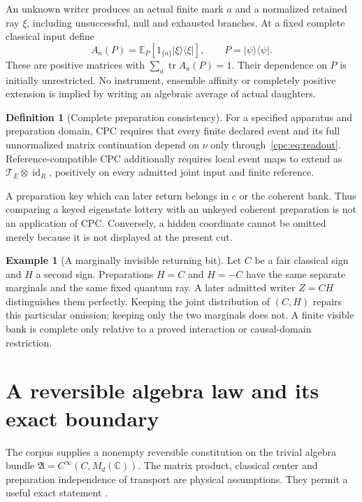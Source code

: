 \documentclass[11pt,oneside,openany]{book}
\theoremstyle{definition}
\newtheorem{definition}[theorem]{Definition}
\newtheorem{example}[theorem]{Example}
\theoremstyle{remark}\newtheorem{remark}[theorem]{Remark}
\begin{document}
An unknown writer produces an actual finite mark $a$ and a normalized retained ray $\xi$, including unsuccessful, null and exhausted branches. At a fixed complete classical input define
\begin{equation}
 A_a(P)=\mathbb E_P[1_{\{a\}}|\xi\rangle\langle\xi|],\qquad
 P=|\psi\rangle\langle\psi|.
 \label{cpc:eq:unknownwriter}
\end{equation}
These are positive matrices with $\sum_a\operatorname{tr}A_a(P)=1$. Their dependence on $P$ is initially unrestricted. No instrument, ensemble affinity or completely positive extension is implied by writing an algebraic average of actual daughters.

\begin{definition}[Complete preparation consistency]
\label{cpc:def:cpc}
For a specified apparatus and preparation domain, CPC requires that every finite declared event and its full unnormalized matrix continuation depend on $\nu$ only through~\eqref{cpc:eq:readout}. Reference-compatible CPC additionally requires local event maps to extend as $\mathcal T_E\otimes\operatorname{id}_R$, positively on every admitted joint input and finite reference.
\end{definition}

A preparation key which can later return belongs in $c$ or the coherent bank. Thus comparing a keyed eigenstate lottery with an unkeyed coherent preparation is not an application of CPC. Conversely, a hidden coordinate cannot be omitted merely because it is not displayed at the present cut.

\begin{example}[A marginally invisible returning bit]
Let $C$ be a fair classical sign and $H$ a second sign. Preparations $H=C$ and $H=-C$ have the same separate marginals and the same fixed quantum ray. A later admitted writer $Z=CH$ distinguishes them perfectly. Keeping the joint distribution of $(C,H)$ repairs this particular omission; keeping only the two marginals does not. A finite visible bank is complete only relative to a proved interaction or causal-domain restriction.
\end{example}

\section{A reversible algebra law and its exact boundary}

The corpus supplies a nonempty reversible constitution on the trivial algebra bundle
$\mathfrak A=C^\infty(C,M_d(\mathbb C))$. The matrix product, classical center and preparation independence of transport are physical assumptions. They permit a useful exact statement \cite{M10}.
\end{document}
